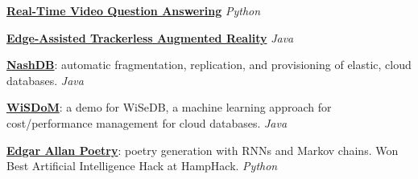 \documentclass[margin,line]{res}
\begin{document}
\begin{resume}
\vspace*{-2.5mm}
 \textbf{\href{https://sofiya.io/projects/visual-and-video-question-answering.html}{Real-Time Video Question Answering}} \textit{Python}
 
\vspace*{-2.5mm}
 \textbf{\href{https://sofiya.io/media/trackerlessAR.pdf}{Edge-Assisted Trackerless Augmented Reality}} \textit{Java}

\vspace*{-2.5mm}
\textbf{\href{https://dl.acm.org/doi/abs/10.1145/3183713.3196935}{NashDB}}: automatic fragmentation, replication, and provisioning of elastic, cloud databases. \textit{Java}

\vspace*{-2.5mm}
 \textbf{\href{https://www.cs.brandeis.edu/~olga/publications/icde17-demo.pdf}{WiSDoM}}: a demo for WiSeDB, a machine learning approach for cost/performance management for cloud databases.  \textit{Java}
 
\vspace*{-2.5mm}
 \textbf{\href{https://github.com/RyanMarcus/EdgarAllanPoetry}{Edgar Allan Poetry}}: poetry generation with RNNs and Markov chains. Won Best Artificial Intelligence Hack at HampHack. \textit{Python}
 

\end{resume}
\end{document}
